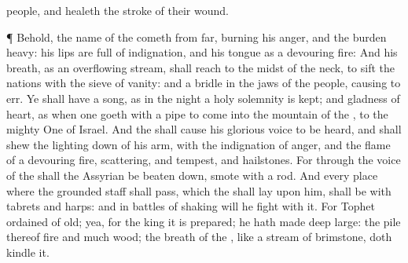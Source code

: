 {people, and
healeth the
stroke of their
wound.
\par }{\PP {}¶ Behold, the
name of the
{}
cometh from
far,
burning
{} his
anger, and the
burden
{}
heavy: his
lips are
full of
indignation, and his
tongue as a
devouring
fire:
And his
breath, as an
overflowing
stream, shall reach to the
midst of the
neck, to
sift the
nations with the
sieve of
vanity: and
{} a
bridle in the
jaws of the
people, causing
{} to
err.
Ye shall have a
song, as in the
night
{} a
holy
solemnity is
kept; and
gladness of
heart, as when one
goeth with a
pipe to
come into the
mountain of the
{}, to the mighty
One of
Israel.
And the
{} shall cause his
glorious
voice to be
heard, and shall
shew the lighting
down of his
arm, with the
indignation of
{}
anger, and
{} the
flame of a
devouring
fire,
{}
scattering, and
tempest, and
hailstones.
For through the
voice of the
{} shall the
Assyrian be beaten
down,
{}
smote with a
rod.
And
{} every
place where the
grounded
staff shall
pass, which the
{} shall
lay upon him,
{} shall be with
tabrets and
harps: and in
battles of
shaking will he
fight with it.
For
Tophet
{}
ordained of
old; yea, for the
king it is
prepared; he hath made
{}
deep
{}
large: the
pile thereof
{}
fire and
much
wood; the
breath of the
{}, like a
stream of
brimstone, doth
kindle it.

}
